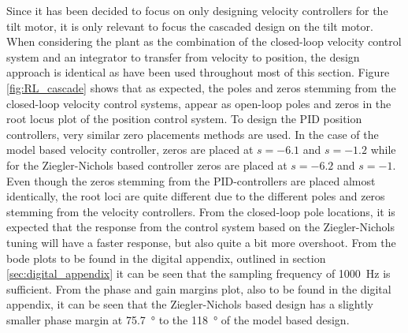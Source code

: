 \documentclass[../../main.tex]{subfiles}
\begin{document}

Since it has been decided to focus on only designing velocity controllers for the tilt motor, it is only relevant to focus the cascaded design on the tilt motor. 
When considering the plant as the combination of the closed-loop velocity control system and an integrator to transfer from velocity to position, the design approach is identical as have been used throughout most of this section. 
Figure \ref{fig:RL_cascade} shows that as expected, the poles and zeros stemming from the closed-loop velocity control systems, appear as open-loop poles and zeros in the root locus plot of the position control system. To design the PID position controllers, very similar zero placements methods  are used. In the case of the model based velocity controller, zeros are placed at $s = -6.1$ and $s = -1.2$ while for the Ziegler-Nichols based controller zeros are placed at $s = -6.2$ and $s = -1$. Even though the zeros stemming from the PID-controllers are placed almost identically, the root loci are quite different due to the different poles and zeros stemming from the velocity controllers. From the closed-loop pole locations, it is expected that the response from the control system based on the Ziegler-Nichols tuning will have a faster response, but also quite a bit more overshoot. From the bode plots to be found in the digital appendix, outlined in section \ref{sec:digital_appendix} it can be seen that the sampling frequency of \SI{1000}{\hertz} is sufficient. From the phase and gain margins plot, also to be found in the digital appendix, it can be seen that the Ziegler-Nichols based design has a slightly smaller phase margin at \SI{75.7}{\degree} to the \SI{118}{\degree} of the model based design.
\end{document}
